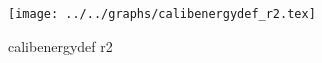 \begin{figure}[h] \centering \texttt{[image: ../../graphs/calibenergydef\_r2.tex]}\caption{calibenergydef r2}\label{gr:calibenergydef_r2} \end{figure}
